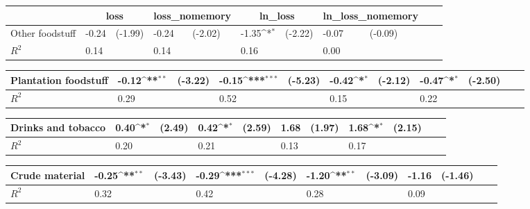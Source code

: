\def\sym#1{\ifmmode^{#1}\else\(^{#1}\)\fi}
\begin{tabular}{p{4cm} p{1.4cm} p{1.2cm} p{1.5cm}  p{1.5cm} p{1.4cm} p{1.2cm} p{1.5cm} p{1.5cm}  p{1.5cm} p{1.5cm} }
                &\multicolumn{2}{c}{loss}    &\multicolumn{2}{c}{loss\_nomemory}&\multicolumn{2}{c}{ln\_loss} &\multicolumn{2}{c}{ln\_loss\_nomemory}\\
\hline
Other foodstuff &    -0.24         &  (-1.99)&    -0.24         &  (-2.02)&    -1.35\sym{*}  &  (-2.22)&    -0.07         &  (-0.09)\\
\hline
\(R^{2}\)       &     0.14         &         &     0.14         &         &     0.16         &         &     0.00         &         \\
\end{tabular}
\def\sym#1{\ifmmode^{#1}\else\(^{#1}\)\fi}
\begin{tabular}{p{4cm} p{1.4cm} p{1.2cm} p{1.5cm}  p{1.5cm} p{1.4cm} p{1.2cm} p{1.5cm} p{1.5cm}  p{1.5cm} p{1.5cm} }
\hline
Plantation foodstuff&    -0.12\sym{**} &  (-3.22)&    -0.15\sym{***}&  (-5.23)&    -0.42\sym{*}  &  (-2.12)&    -0.47\sym{*}  &  (-2.50)\\
\hline
\(R^{2}\)       &     0.29         &         &     0.52         &         &     0.15         &         &     0.22         &         \\
\end{tabular}
\def\sym#1{\ifmmode^{#1}\else\(^{#1}\)\fi}
\begin{tabular}{p{4cm} p{1.4cm} p{1.2cm} p{1.5cm}  p{1.5cm} p{1.4cm} p{1.2cm} p{1.5cm} p{1.5cm}  p{1.5cm} p{1.5cm} }
\hline
Drinks and tobacco&     0.40\sym{*}  &   (2.49)&     0.42\sym{*}  &   (2.59)&     1.68         &   (1.97)&     1.68\sym{*}  &   (2.15)\\
\hline
\(R^{2}\)       &     0.20         &         &     0.21         &         &     0.13         &         &     0.17         &         \\
\end{tabular}
\def\sym#1{\ifmmode^{#1}\else\(^{#1}\)\fi}
\begin{tabular}{p{4cm} p{1.4cm} p{1.2cm} p{1.5cm}  p{1.5cm} p{1.4cm} p{1.2cm} p{1.5cm} p{1.5cm}  p{1.5cm} p{1.5cm} }
\hline
Crude material  &    -0.25\sym{**} &  (-3.43)&    -0.29\sym{***}&  (-4.28)&    -1.20\sym{**} &  (-3.09)&    -1.16         &  (-1.46)\\
\hline
\(R^{2}\)       &     0.32         &         &     0.42         &         &     0.28         &         &     0.09         &         \\
\end{tabular}
